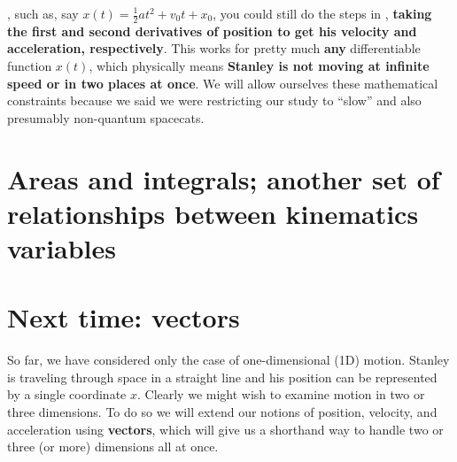 \documentclass{tufte-handout}
\begin{document}
, such as, say $x(t)=\frac{1}{2}at^2 + v_0 t + x_0$, you could still do the steps in , \textbf{taking the first and second derivatives of position to get his velocity and acceleration, respectively}. This works for pretty much \textbf{any} differentiable function $x(t)$, which physically means \textbf{Stanley is not moving at infinite speed or in two places at once}. We will allow ourselves these mathematical constraints because we said we were restricting our study to ``slow'' and also presumably non-quantum spacecats. 



\section{Areas and integrals; another set of relationships between kinematics variables}
\cite{greenspan1987calculus, kreysig2015advanced}

\section{Next time: vectors}
So far, we have considered only the case of one-dimensional (1D) motion. Stanley is traveling through space in a straight line and his position can be represented by a single coordinate $x$. Clearly we might wish to examine motion in two or three dimensions. To do so we will extend our notions of position, velocity, and acceleration using \textbf{vectors}, which will give us a shorthand way to handle two or three (or more) dimensions all at once. 


\end{document}
